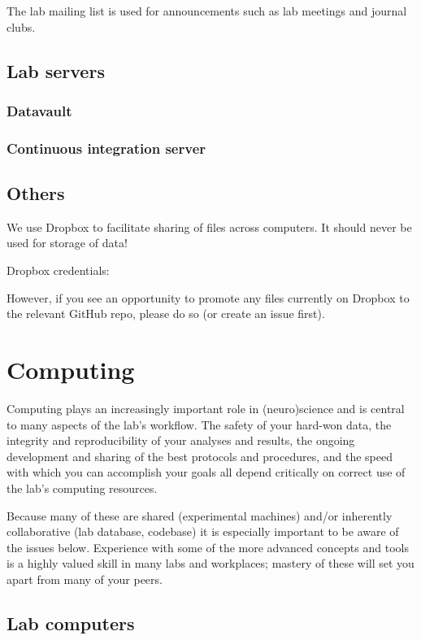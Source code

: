 \documentclass{tufte-book}
\begin{document}
The lab mailing list is used for announcements such as lab meetings
and journal clubs.

\section{Lab servers}

\subsection{Datavault}

\subsection{Continuous integration server}

\section{Others}

We use Dropbox to facilitate sharing of files across computers. It
should never be used for storage of data!

Dropbox credentials:

However, if you see an opportunity to promote any files currently on
Dropbox to the relevant GitHub repo, please do so (or create an issue
first).

\chapter{Computing}

Computing plays an increasingly important role in (neuro)science and
is central to many aspects of the lab's workflow. The safety of your
hard-won data, the integrity and reproducibility of your analyses and
results, the ongoing development and sharing of the best protocols and
procedures, and the speed with which you can accomplish your goals all
depend critically on correct use of the lab's computing resources.

Because many of these are shared (experimental machines) and/or
inherently collaborative (lab database, codebase) it is especially
important to be aware of the issues below. Experience with some of the
more advanced concepts and tools is a highly valued skill in many labs
and workplaces; mastery of these will set you apart from many of your
peers.

\section{Lab computers}
\end{document}
